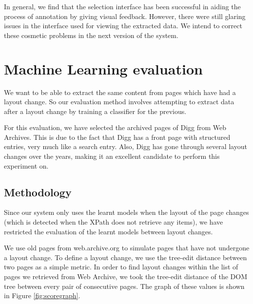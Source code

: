 In general, we find that the selection interface has been successful in aiding
the process of annotation by giving visual feedback. However, there were still
glaring issues in the interface used for viewing the extracted data. We intend to
correct these cosmetic problems in the next version of the system.

\section{Machine Learning evaluation}
 We want to be able to extract the same content from pages which have had a layout change. So our
 evaluation method involves attempting to extract data after a layout change by training a
 classifier for the previous.
 
 For this evaluation, we have selected the archived pages of Digg from Web Archives. This is
 due to the fact that Digg has a front page with structured entries, very much like a search
 entry. Also, Digg has gone through several layout changes over the years, making it an excellent
 candidate to perform this experiment on.
\subsection{Methodology}
	Since our system only uses the learnt models when the layout of the page changes (which is 
detected when the XPath does not retrieve any items), we have restricted the evaluation of 
the learnt models between layout changes.

	We use old pages from web.archive.org to simulate pages that have not
undergone a layout change. To define a layout change, we use the tree-edit distance \cite{Zhang1989} between two pages as
a simple metric. In order to find layout changes within the list of pages we retrieved from Web
Archive, we took the tree-edit distance of the DOM tree between every pair of consecutive pages.
The graph of these values is shown in Figure \ref{fig:scoregraph}.

